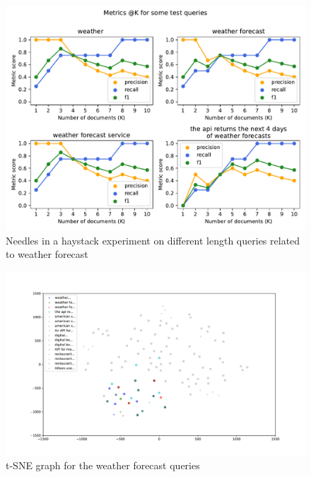 \begin{figure}[!h]
    \begin{center}
        \includegraphics[width=0.8\linewidth]{assets/pdf/evaluation/prec-rec-weather}
    \end{center}

    \caption{Needles in a haystack experiment on different length queries related to weather forecast}
    \label{fig:nh-2}
\end{figure}

\begin{figure}[!h]
    \begin{center}
        \includegraphics[width=0.8\linewidth]{assets/pdf/evaluation/tsne-weather}
    \end{center}

    \caption{t-SNE graph for the weather forecast queries}
    \label{fig:tsne-2}
\end{figure}


